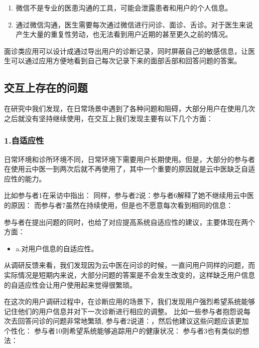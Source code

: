 \begin{enumerate}
    \item 微信不是专业的医患沟通的工具，可能会泄露患者和用户的个人信息。

    \item 通过微信沟通，医生需要每次通过微信进行问诊、面诊、舌诊。对于医生来说产生大量的重复性劳动，也无法看到用户近期的甚至更久之前的情况。

\end{enumerate}

面诊类应用可以设计成通过导出用户的诊断记录，同时屏蔽自己的敏感信息，让医生可以通过应用方便地看到自己每次记录下来的面部舌部和回答问题的答案。

\subsection{交互上存在的问题}

在研究中我们发现，在日常场景中遇到了各种问题和阻碍，大部分用户在使用几次之后就没有坚持继续使用，在交互上我们发现主要有以下几个方面：

\subsubsection{1.自适应性}

日常环境和诊所环境不同，日常环境下需要用户长期使用。但是，大部分的参与者在使用云中医一到两次后就不再使用了，其中一个重要的原因就是云中医缺乏自适应性的能力。

比如参与者1在采访中指出：
同样，参与者2说：参与者6解释了她不继续用云中医的原因：
而参与者7虽然在持续使用，但是也不愿意每次看到相同的信息：

参与者在提出问题的同时，也给了对应提高系统自适应性的建议，主要体现在两个方面：

\begin{itemize}
\item a.对用户信息的自适应性。
\end{itemize}

从调研反馈来看，我们发现因为云中医在问诊的时候，一直问用户同样的问题，而实际情况是短期内来说，大部分问题的答案是不会发生改变的，这样缺乏用户信息的自适应性会让用户使用起来觉得很繁琐。

在这次的用户调研过程中，在诊断应用的场景下，我们发现用户强烈希望系统能够记住他们的用户信息并对下一次诊断进行相应的调整。
比如一些参与者抱怨说每次去回答问诊的问题非常地繁琐, 参与者2说道：，然后他建议这些问题应该更加个性化：
参与者10则希望系统能够追踪用户的健康状况：
参与者3也有类似的想法：

